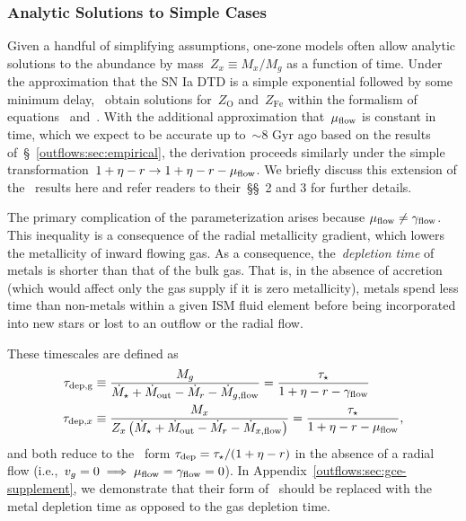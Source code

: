 \subsubsection{Analytic Solutions to Simple Cases}
\label{outflows:sec:gce:onezone:analytic}
Given a handful of simplifying assumptions, one-zone models often allow
analytic solutions to the abundance by mass~$Z_x \equiv M_x / M_g$ as a
function of time.
Under the approximation that the SN Ia DTD is a simple exponential followed by
some minimum delay,~\citet{Weinberg2017b} obtain solutions for~$Z_\text{O}$
and~$Z_\text{Fe}$ within the formalism of equations~
and~.
With the additional approximation that~$\mu_{\text{flow}}$ is constant in time, which
we expect to be accurate up to~$\sim$8 Gyr ago based on the results
of~\S~\ref{outflows:sec:empirical}, the derivation proceeds similarly under the
simple transformation~$1 + \eta - r \rightarrow 1 + \eta - r - \mu_{\text{flow}}$.
We briefly discuss this extension of the~\citet{Weinberg2017b} results here and
refer readers to their~\S\S~2 and 3 for further details.
\par
The primary complication of the parameterization arises because
$\mu_{\text{flow}} \neq \gamma_{\text{flow}}$.
This inequality is a consequence of the radial metallicity gradient, which
lowers the metallicity of inward flowing gas.
As a consequence, the~\textit{depletion time} of metals is shorter than that of
the bulk gas.
That is, in the absence of accretion (which would affect only the gas supply if
it is zero metallicity), metals spend less time than non-metals within a given
ISM fluid element before being incorporated into new stars or lost to an
outflow or the radial flow.
\par
These timescales are defined as
\begin{subequations}\begin{align}
\tau_\text{dep,g} &\equiv \frac{M_g}{
	\dot{M}_\star + \dot{M}_\text{out} - \dot{M}_r - \dot{M}_{g,\text{flow}}
} = \frac{\tau_\star}{1 + \eta - r - \gamma_{\text{flow}}}
\\
\tau_\text{dep,$x$} &\equiv \frac{M_x}{
	Z_x\left(\dot{M}_\star + \dot{M}_\text{out} - \dot{M}_r - \dot{M}_{x,\text{flow}}
	\right)
} = \frac{\tau_\star}{1 + \eta - r - \mu_{\text{flow}}},
\end{align}\end{subequations}
and both reduce to the~\citet{Weinberg2017b} form
$\tau_\text{dep} = \tau_\star / (1 + \eta - r)$ in the absence of a radial
flow (i.e.,~$v_g = 0 \implies \mu_{\text{flow}} = \gamma_{\text{flow}} = 0$).
In Appendix~\ref{outflows:sec:gce-supplement}, we demonstrate that their form
of~ should be replaced with the metal depletion time as opposed
to the gas depletion time.

